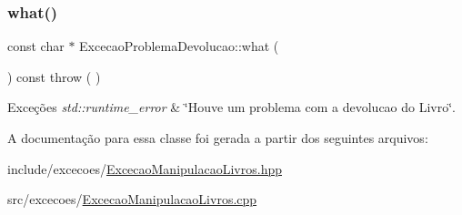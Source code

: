\subsubsection{\texorpdfstring{what()}{what()}}
{\footnotesize\ttfamily const char $\ast$ Excecao\+Problema\+Devolucao\+::what (\begin{DoxyParamCaption}{ }\end{DoxyParamCaption}) const throw ( ) \hspace{0.3cm}{\ttfamily [virtual]}}


\begin{DoxyExceptions}{Exceções}
{\em std\+::runtime\+\_\+error} & \char`\"{}\+Houve um problema com a devolucao do Livro\char`\"{}. \\
\hline
\end{DoxyExceptions}


A documentação para essa classe foi gerada a partir dos seguintes arquivos\+:\begin{DoxyCompactItemize}
\item 
include/excecoes/\mbox{\hyperlink{_excecao_manipulacao_livros_8hpp}{Excecao\+Manipulacao\+Livros.\+hpp}}\item 
src/excecoes/\mbox{\hyperlink{_excecao_manipulacao_livros_8cpp}{Excecao\+Manipulacao\+Livros.\+cpp}}\end{DoxyCompactItemize}
